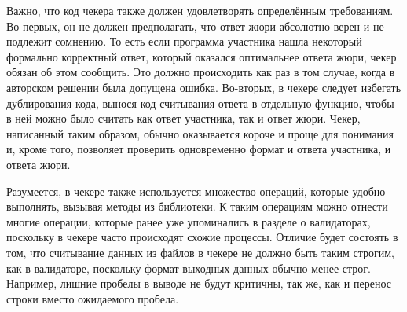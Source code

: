Важно, что код чекера также должен удовлетворять определённым требованиям. Во-первых, он не должен предполагать, что ответ жюри абсолютно верен и не подлежит сомнению. То есть если программа участника нашла некоторый формально корректный ответ, который оказался оптимальнее ответа жюри, чекер обязан об этом сообщить. Это должно происходить как раз в том случае, когда в авторском решении была допущена ошибка. Во-вторых, в чекере следует избегать дублирования кода, вынося код считывания ответа в отдельную функцию, чтобы в ней можно было считать как ответ участника, так и ответ жюри. Чекер, написанный таким образом, обычно оказывается короче и проще для понимания и, кроме того, позволяет проверить одновременно формат и ответа участника, и ответа жюри.

Разумеется, в чекере также используется множество операций, которые удобно выполнять, вызывая методы из библиотеки. К таким операциям можно отнести многие операции, которые ранее уже упоминались в разделе о валидаторах, поскольку в чекере часто происходят схожие процессы. Отличие будет состоять в том, что считывание данных из файлов в чекере не должно быть таким строгим, как в валидаторе, поскольку формат выходных данных обычно менее строг. Например, лишние пробелы в выводе не будут критичны, так же, как и перенос строки вместо ожидаемого пробела.